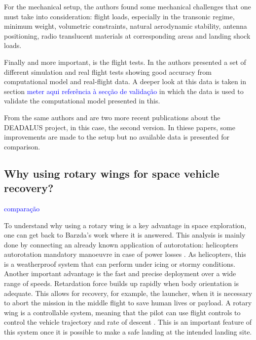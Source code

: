 For the mechanical setup, the authors found some mechanical challenges that one must take into consideration: flight loads, especially in the transonic regime, minimum weight, volumetric constraints, natural aerodynamic stability, antenna positioning, radio translucent materials at corresponding areas and landing shock loads.

Finally and more important, is the flight tests. In \cite{riegler_project_nodate} the authors presented a set of different simulation and real flight tests showing good accuracy from computational model and real-flight data. A deeper look at this data is taken in section \textcolor{blue}{meter aqui referência à secção de validação} in which the data is used to validate the computational model presented in this.

From the same authors \cite{mehringer_suborbital_2022} and \cite{bergmann_daedalus_2024} are two more recent publications about the DEADALUS project, in this case, the second version. In thiese papers, some improvements are made to the setup but no available data is presented for comparison.


\subsection{Why using rotary wings for space vehicle recovery?}

\textcolor{blue}{comparação}

To understand why using a rotary wing is a key advantage in space exploration, one can get back to Barzda's work \cite{barzda_rotors_1964} where it is answered. This analysis is mainly done by connecting an already known application of autorotation: helicopters autorotation mandatory manoeuvre in case of power losses \cite{federal_aviation_administration_helicopter_2021}. As helicopters, this is a weatherproof system that can perform under icing or stormy conditions. Another important advantage is the fast and precise deployment over a wide range of speeds. Retardation force builds up rapidly when body orientation is adequate. This allows for recovery, for example, the launcher, when it is necessary to abort the mission in the middle flight to save human lives or payload. A rotary wing is a controllable system, meaning that the pilot can use flight controls to control the vehicle trajectory and rate of descent \cite{federal_aviation_administration_helicopter_2021}. This is an important feature of this system once it is possible to make a safe landing at the intended landing site.

